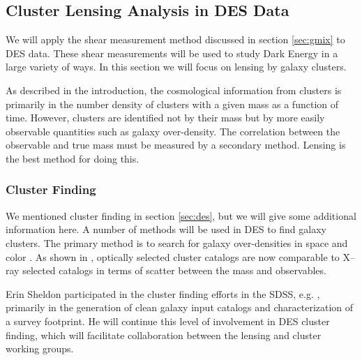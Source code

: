 \documentclass[12pt]{article}
\begin{document}

\subsection{Cluster Lensing Analysis in DES Data} \label{sec:deslensing}

We will apply the shear measurement method discussed in section \ref{sec:gmix}
to DES data. These shear measurements will be used to study Dark Energy in a
large variety of ways.  In this section we will focus on lensing by
galaxy clusters.

As described in the introduction, the cosmological information from clusters is
primarily in the number density of clusters with a given mass as a function of
time.  However, clusters are identified not by their mass but by more easily
observable quantities such as galaxy over-density. The correlation between the
observable and true mass must be measured by a secondary method.  Lensing is
the best method for doing this.  

\subsubsection{Cluster Finding}

We mentioned cluster finding in section \ref{sec:des}, but we will give some
additional information here. A number of methods will be used in DES to find
galaxy clusters.  The primary method is to search for galaxy over-densities in
space and color \cite{KoesterAlgorithm07,Rykoff12,MillerC4}.  As shown in
\cite{Rykoff12}, optically selected cluster catalogs are now comparable to
X--ray selected catalogs in terms of scatter between the mass and observables.

Erin Sheldon participated in the cluster finding efforts in the SDSS, e.g.
\cite{KoesterAlgorithm07}, primarily in the generation of clean galaxy input
catalogs and characterization of a survey footprint.  He will continue this
level of involvement in DES cluster finding, which will facilitate
collaboration between the lensing and cluster working groups.
\end{document}
